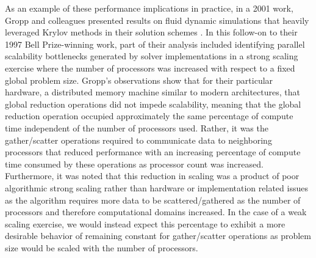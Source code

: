 As an example of these performance implications in practice, in a 2001
work, Gropp and colleagues presented results on fluid dynamic
simulations that heavily leveraged Krylov methods in their solution
schemes \cite{gropp_high-performance_2001}. In this follow-on to
their 1997 Bell Prize-winning work, part of their analysis included
identifying parallel scalability bottlenecks generated by solver
implementations in a strong scaling exercise where the number of
processors was increased with respect to a fixed global problem
size. Gropp's observations show that for their particular hardware, a
distributed memory machine similar to modern architectures, that
global reduction operations did not impede scalability, meaning that
the global reduction operation occupied approximately the same
percentage of compute time independent of the number of processors
used. Rather, it was the gather/scatter operations required to
communicate data to neighboring processors that reduced performance
with an increasing percentage of compute time consumed by these
operations as processor count was increased. Furthermore, it was noted
that this reduction in scaling was a product of poor algorithmic
strong scaling rather than hardware or implementation related issues
as the algorithm requires more data to be scattered/gathered as the
number of processors and therefore computational domains increased. In
the case of a weak scaling exercise, we would instead expect this
percentage to exhibit a more desirable behavior of remaining constant
for gather/scatter operations as problem size would be scaled with the
number of processors.
